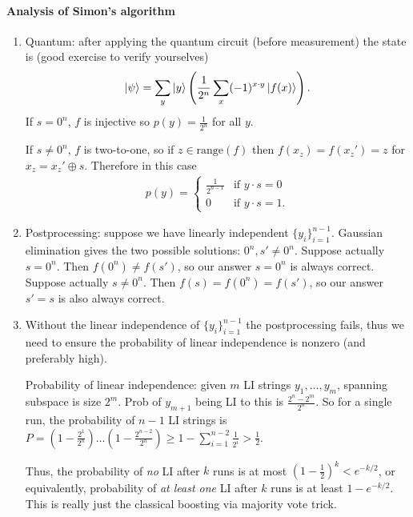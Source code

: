 \paragraph{Analysis of Simon's algorithm}
\begin{enumerate}
    \item Quantum: after applying the quantum circuit (before measurement) the state is (good exercise to verify yourselves)
    \begin{align*}
        \ket{\psi} = \sum_y \ket{y} \left( \frac{1}{2^n} \sum_x (-1)^{x \cdot y} \ket{f(x)} \right).
    \end{align*}
    If $s=0^n$, $f$ is injective so $p(y) = \frac{1}{2^n}$ for all $y$. 
    
    If $s \neq 0^n$, $f$ is two-to-one, so if $z \in \text{range}(f)$ then $f(x_z) = f(x_z') = z$ for $x_z = x_z' \oplus s$. Therefore in this case 
    \begin{align*}
    p(y)=
    \begin{cases}
        \frac{1}{2^{n-1}} & \text{if } y\cdot s = 0\\
        0 & \text{if } y\cdot s = 1.
    \end{cases}
    \end{align*}
        
    \item Postprocessing: suppose we have linearly independent $\{y_i\}_{i=1}^{n-1}$. Gaussian elimination gives the two possible solutions: $0^n,s'\neq 0^n$. Suppose actually $s=0^n$. Then $f(0^n)\neq f(s')$, so our answer $s=0^n$ is always correct. Suppose actually $s \neq 0^n$. Then $f(s)=f(0^n)=f(s')$, so our answer $s'=s$ is also always correct.
    
    \item Without the linear independence of $\{y_i\}_{i=1}^{n-1}$ the postprocessing fails, thus we need to ensure the probability of linear independence is nonzero (and preferably high).
    
    Probability of linear independence: given $m$ LI strings $y_1,\dots,y_m$, spanning subspace is size $2^m$. Prob of $y_{m+1}$ being LI to this is $\frac{2^n-2^m}{2^n}$. So for a single run, the probability of $n-1$ LI strings is $P=(1-\frac{2^1}{2^n})\dots(1-\frac{2^{n-2}}{2^n}) \geq 1-\sum_{i=1}^{n-2} \frac{1}{2^i} > \frac{1}{2}$. 
    
    Thus, the probability of \textit{no} LI after $k$ runs is at most $(1-\frac{1}{2})^k < e^{-k/2}$, or equivalently, probability of \textit{at least one} LI after $k$ runs is at least $1 - e^{-k/2}$. This is really just the classical boosting via majority vote trick.
\end{enumerate}



